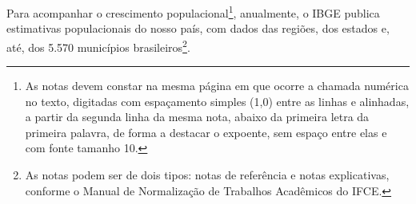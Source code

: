 \newpage

Para acompanhar o crescimento populacional\footnote{As notas devem constar na mesma página em que ocorre a chamada numérica no texto, digitadas com espaçamento simples (1,0) entre as linhas e alinhadas, a partir da segunda linha da mesma nota, abaixo da primeira letra da primeira palavra, de forma a destacar o expoente, sem espaço entre elas e com fonte tamanho 10.}, anualmente, o IBGE publica estimativas populacionais do nosso país, com dados das regiões, dos estados e, até, dos 5.570 municípios brasileiros\footnote{As notas podem ser de dois tipos: notas de referência e notas explicativas, conforme o Manual de Normalização de Trabalhos Acadêmicos do IFCE.}. 
